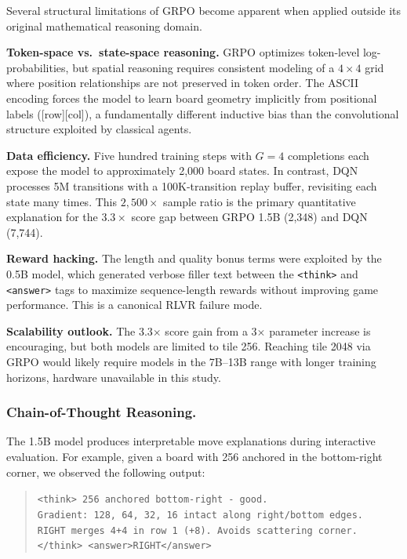 \documentclass[letterpaper]{article}
\begin{document}
Several structural limitations of GRPO become apparent when applied outside its original mathematical reasoning domain.

\textbf{Token-space vs.\ state-space reasoning.} GRPO optimizes token-level log-probabilities, but spatial reasoning requires consistent modeling of a $4{\times}4$ grid where position relationships are not preserved in token order. The ASCII encoding forces the model to learn board geometry implicitly from positional labels ([row][col]), a fundamentally different inductive bias than the convolutional structure exploited by classical agents.

\textbf{Data efficiency.} Five hundred training steps with $G{=}4$ completions each expose the model to approximately 2,000 board states. In contrast, DQN processes 5M transitions with a 100K-transition replay buffer, revisiting each state many times. This $2{,}500\times$ sample ratio is the primary quantitative explanation for the $3.3\times$ score gap between GRPO 1.5B (2,348) and DQN (7,744).

\textbf{Reward hacking.} The length and quality bonus terms were exploited by the 0.5B model, which generated verbose filler text between the \texttt{<think>} and \texttt{<answer>} tags to maximize sequence-length rewards without improving game performance. This is a canonical RLVR failure mode.

\textbf{Scalability outlook.} The 3.3$\times$ score gain from a 3$\times$ parameter increase is encouraging, but both models are limited to tile 256. Reaching tile 2048 via GRPO would likely require models in the 7B--13B range with longer training horizons, hardware unavailable in this study.

\subsubsection{Chain-of-Thought Reasoning.}

The 1.5B model produces interpretable move explanations during interactive evaluation. For example, given a board with 256 anchored in the bottom-right corner, we observed the following output:

\begin{quote}
\small\texttt{<think> 256 anchored bottom-right - good.} \\
\small\texttt{Gradient: 128, 64, 32, 16 intact along right/bottom edges.} \\
\small\texttt{RIGHT merges 4+4 in row~1 (+8). Avoids scattering corner.} \\
\small\texttt{</think> <answer>RIGHT</answer>}
\end{quote}
\end{document}

